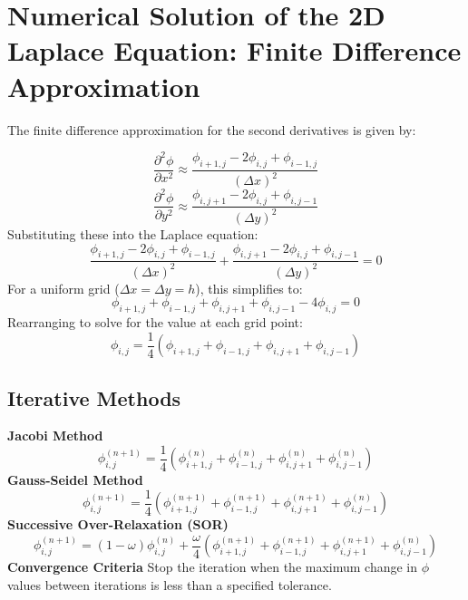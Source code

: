 \pagebreak
\section{Numerical Solution of the 2D Laplace Equation: Finite Difference Approximation}

The finite difference approximation for the second derivatives is given by:

\[
\frac{\partial^2 \phi}{\partial x^2} \approx \frac{\phi_{i+1,j} - 2\phi_{i,j} + \phi_{i-1,j}}{(\Delta x)^2}
\]
\[
\frac{\partial^2 \phi}{\partial y^2} \approx \frac{\phi_{i,j+1} - 2\phi_{i,j} + \phi_{i,j-1}}{(\Delta y)^2}
\]
Substituting these into the Laplace equation:
\[
\frac{\phi_{i+1,j} - 2\phi_{i,j} + \phi_{i-1,j}}{(\Delta x)^2} + \frac{\phi_{i,j+1} - 2\phi_{i,j} + \phi_{i,j-1}}{(\Delta y)^2} = 0
\]
For a uniform grid (\(\Delta x = \Delta y = h\)), this simplifies to:
\[
\phi_{i+1,j} + \phi_{i-1,j} + \phi_{i,j+1} + \phi_{i,j-1} - 4\phi_{i,j} = 0
\]
Rearranging to solve for the value at each grid point:
\[
\phi_{i,j} = \frac{1}{4} (\phi_{i+1,j} + \phi_{i-1,j} + \phi_{i,j+1} + \phi_{i,j-1})
\]

\subsection{Iterative Methods}

{\bf Jacobi Method}
\[
\phi_{i,j}^{(n+1)} = \frac{1}{4} (\phi_{i+1,j}^{(n)} + \phi_{i-1,j}^{(n)} + \phi_{i,j+1}^{(n)} + \phi_{i,j-1}^{(n)})
\]
{\bf Gauss-Seidel Method}
\[
\phi_{i,j}^{(n+1)} = \frac{1}{4} (\phi_{i+1,j}^{(n+1)} + \phi_{i-1,j}^{(n+1)} + \phi_{i,j+1}^{(n+1)} + \phi_{i,j-1}^{(n)})
\]
{ \bf  Successive Over-Relaxation (SOR)}
\[
\phi_{i,j}^{(n+1)} = (1 - \omega) \phi_{i,j}^{(n)} + \frac{\omega}{4} (\phi_{i+1,j}^{(n+1)} + \phi_{i-1,j}^{(n+1)} + \phi_{i,j+1}^{(n+1)} + \phi_{i,j-1}^{(n)})
\]
{\bf Convergence Criteria}
Stop the iteration when the maximum change in \(\phi\) values between iterations is less than a specified tolerance.



